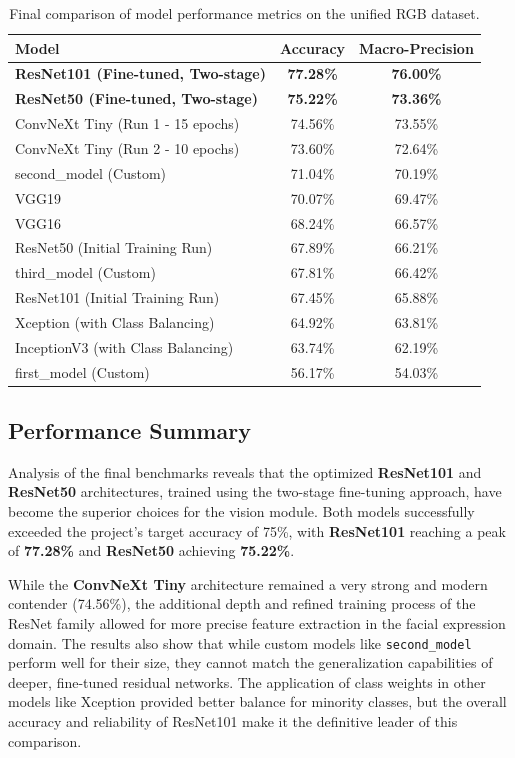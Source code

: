 \documentclass{article}
\begin{document}
\begin{table}[H]
    \centering
    \begin{tabular}{|l|c|c|}
        \hline
        \textbf{Model} & \textbf{Accuracy} & \textbf{Macro-Precision} \\
        \hline
        \textbf{ResNet101 (Fine-tuned, Two-stage)} & \textbf{77.28\%} & \textbf{76.00\%} \\
        \textbf{ResNet50 (Fine-tuned, Two-stage)} & \textbf{75.22\%} & \textbf{73.36\%} \\
        ConvNeXt Tiny (Run 1 - 15 epochs) & 74.56\% & 73.55\% \\
        ConvNeXt Tiny (Run 2 - 10 epochs) & 73.60\% & 72.64\% \\
        second\_model (Custom) & 71.04\% & 70.19\% \\
        VGG19 & 70.07\% & 69.47\% \\
        VGG16 & 68.24\% & 66.57\% \\
        ResNet50 (Initial Training Run) & 67.89\% & 66.21\% \\
        third\_model (Custom) & 67.81\% & 66.42\% \\
        ResNet101 (Initial Training Run) & 67.45\% & 65.88\% \\
        Xception (with Class Balancing) & 64.92\% & 63.81\% \\
        InceptionV3 (with Class Balancing) & 63.74\% & 62.19\% \\
        first\_model (Custom) & 56.17\% & 54.03\% \\
        \hline
    \end{tabular}
    \caption{Final comparison of model performance metrics on the unified RGB dataset.}
    \label{tab:final_results_updated}
\end{table}

\subsection{Performance Summary}
Analysis of the final benchmarks reveals that the optimized \textbf{ResNet101} and \textbf{ResNet50} architectures, trained using the two-stage fine-tuning approach, have become the superior choices for the vision module. Both models successfully exceeded the project's target accuracy of 75\%, with \textbf{ResNet101} reaching a peak of \textbf{77.28\%} and \textbf{ResNet50} achieving \textbf{75.22\%}. 

While the \textbf{ConvNeXt Tiny} architecture remained a very strong and modern contender (74.56\%), the additional depth and refined training process of the ResNet family allowed for more precise feature extraction in the facial expression domain. The results also show that while custom models like \texttt{second\_model} perform well for their size, they cannot match the generalization capabilities of deeper, fine-tuned residual networks. The application of class weights in other models like Xception provided better balance for minority classes, but the overall accuracy and reliability of ResNet101 make it the definitive leader of this comparison.
\end{document}
